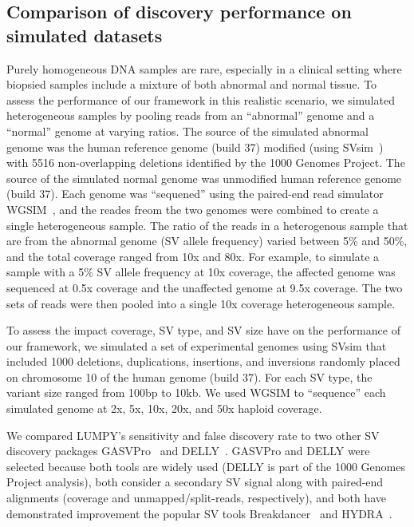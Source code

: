 \documentclass[10pt]{bmc_article}
\newenvironment{bmcformat}{\begin{raggedright}\baselineskip20pt\sloppy\setboolean{publ}{false}}{\end{raggedright}\baselineskip20pt\sloppy}
\begin{document}
\begin{bmcformat}
\subsection*{Comparison of discovery performance on simulated datasets}
Purely homogeneous DNA samples are rare, especially in a clinical setting where
biopsied samples include a mixture of both abnormal and normal tissue.  To
assess the performance of our framework in this realistic scenario, we simulated
heterogeneous samples by pooling reads from an ``abnormal'' genome and a
``normal'' genome at varying ratios.  The source of the simulated abnormal
genome was the human reference genome (build 37) modified (using
SVsim~\cite{faustunpub}) with 5516 non-overlapping deletions identified by the
1000 Genomes Project.  The  source of the simulated normal genome was unmodified
human reference genome (build 37).  Each genome was ``sequened'' using the
paired-end read simulator WGSIM~\cite{liunpub}, and the reades freom the two
genomes were combined to create a single heterogeneous sample.  The ratio of the
reads in a heterogenous sample that are from the abnormal genome (SV allele
frequency) varied between 5\% and 50\%, and the total coverage ranged from 10x
and 80x.  For example, to simulate a sample with a 5\% SV allele frequency at
10x coverage, the affected genome was sequenced at 0.5x coverage and the
unaffected genome at 9.5x coverage.  The two sets of reads were then pooled into
a single 10x coverage heterogeneous sample.

To assess the impact coverage, SV type, and SV size have on the performance of
our framework, we simulated a set of experimental genomes using SVsim that
included 1000 deletions, duplications, insertions, and inversions randomly
placed on chromosome 10 of the human genome (build 37).  For each SV type, 
the variant size ranged from 100bp to 10kb.  We used WGSIM to ``sequence'' each
simulated genome at 2x, 5x, 10x, 20x, and 50x haploid coverage.  


We compared LUMPY’s sensitivity and false discovery rate to two other SV
discovery packages GASVPro~\cite{sindi2012} and DELLY~\cite{rausch2012b}.
GASVPro and DELLY were selected because both tools are widely used (DELLY is
part of the 1000 Genomes Project analysis), both consider a secondary SV signal
along with paired-end alignments (coverage and unmapped/split-reads,
respectively), and both have demonstrated improvement the popular SV tools
Breakdancer~\cite{chen2009} and HYDRA~\cite{quinlan2010b}. 



\end{bmcformat}
\end{document}
